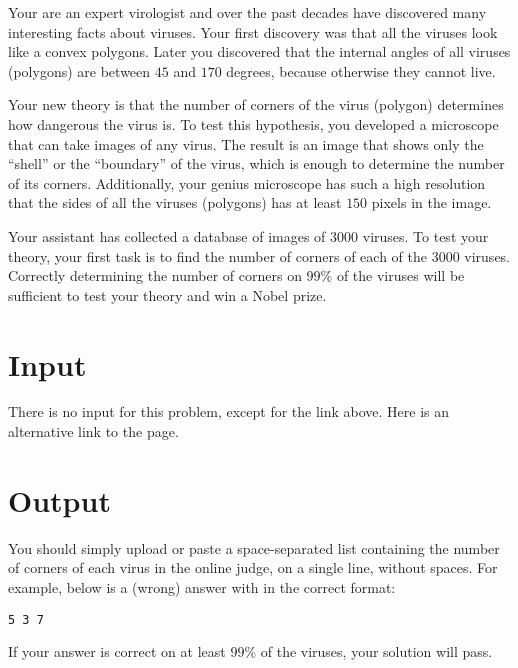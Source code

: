 Your are an expert virologist and over the past decades have discovered many interesting facts about viruses.
Your first discovery was that all the viruses look like a convex polygons.
Later you discovered that the internal angles of all viruses (polygons) are between $45$ and $170$ degrees, because otherwise they cannot live.

Your new theory is that the number of corners of the virus (polygon) determines how dangerous the virus is.
To test this hypothesis, you developed a microscope that can take images of any virus.
The result is an image that shows only the ``shell'' or the ``boundary'' of the virus, which is enough to determine the number of its corners.
Additionally, your genius microscope has such a high resolution that the sides of all the viruses (polygons) has at least $150$ pixels in the image.

Your assistant has collected a database of images of $3000$ viruses.
To test your theory, your first task is to find the number of corners of each of the $3000$ viruses.
Correctly determining the number of corners on $99\%$ of the viruses will be sufficient to test your theory and win a Nobel prize.

\section*{Input}
There is no input for this problem, except for the link above.
Here is an alternative link to the page.

\section*{Output}
You should simply upload or paste a space-separated list containing the number of corners of each virus in the online judge, on a single line, without spaces.
For example, below is a (wrong) answer with in the correct format:
\begin{center}
    \texttt{5 3 7}
\end{center}
If your answer is correct on at least $99\%$ of the viruses, your solution will pass.

%
%
%
